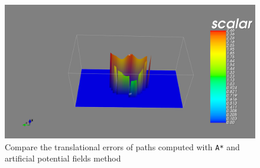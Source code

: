 \begin{figure}[H]
\centering
\includegraphics[scale=0.3]{./fig/tErrorMayavi.png}
\caption{Compare the translational errors of paths computed with \texttt{A*} and artificial potential fields method}
\label{fig:tErrorMayavi}
\end{figure}



